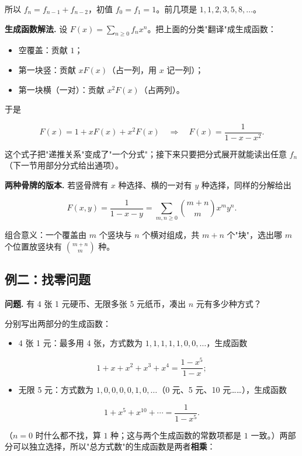 所以 $f_n=f_{n-1}+f_{n-2}$，初值 $f_0=f_1=1$。前几项是 $1,1,2,3,5,8,\dots$。

\textbf{生成函数解法.} 设 $F(x)=\sum_{n\ge0}f_nx^n$。把上面的分类"翻译"成生成函数：

\begin{itemize}
\item 空覆盖：贡献 $1$；
\item 第一块竖：贡献 $xF(x)$（占一列，用 $x$ 记一列）；
\item 第一块横（一对）：贡献 $x^2F(x)$（占两列）。
\end{itemize}


于是

\[
F(x)=1+xF(x)+x^2F(x)
\quad\Longrightarrow\quad
F(x)=\frac{1}{1-x-x^2}.
\]

这个式子把"递推关系"变成了"一个分式"；接下来只要把分式展开就能读出任意 $f_n$（下一节用部分分式给出通项）。

\textbf{两种骨牌的版本.} 若竖骨牌有 $x$ 种选择、横的一对有 $y$ 种选择，同样的分解给出

\[
F(x,y)=\frac{1}{1-x-y}=\sum_{m,n\ge0}\binom{m+n}{m}x^my^n.
\]

组合意义：一个覆盖由 $m$ 个竖块与 $n$ 个横对组成，共 $m+n$ 个"块"，选出哪 $m$ 个位置放竖块有 $\binom{m+n}{m}$ 种。

\subsection{例二：找零问题}


\textbf{问题.} 有 4 张 1 元硬币、无限多张 5 元纸币，凑出 $n$ 元有多少种方式？

分别写出两部分的生成函数：

\begin{itemize}
\item 4 张 1 元：最多用 4 张，方式数为 $1,1,1,1,1,0,0,\dots$，生成函数
\end{itemize}


\[
1+x+x^2+x^3+x^4=\frac{1-x^5}{1-x};
\]

\begin{itemize}
\item 无限 5 元：方式数为 $1,0,0,0,0,1,0,\dots$（0 元、5 元、10 元……），生成函数
\end{itemize}


\[
1+x^5+x^{10}+\cdots=\frac{1}{1-x^5}.
\]

（$n=0$ 时什么都不找，算 $1$ 种；这与两个生成函数的常数项都是 $1$ 一致。）两部分可以独立选择，所以"总方式数"的生成函数是两者\textbf{相乘}：

